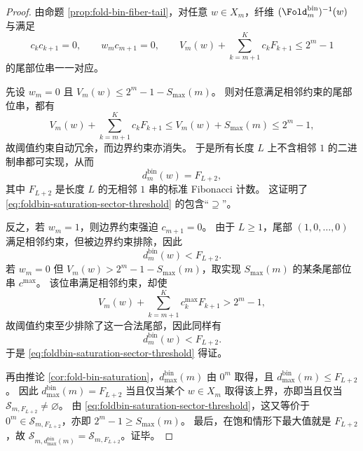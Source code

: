 \begin{proof}
由命题 \ref{prop:fold-bin-fiber-tail}，对任意 \(w\in X_m\)，纤维 \((\Fold_m^{\mathrm{bin}})^{-1}(w)\) 与满足
\[
c_kc_{k+1}=0,\qquad
w_mc_{m+1}=0,\qquad
V_m(w)+\sum_{k=m+1}^{K}c_kF_{k+1}\le 2^m-1
\]
的尾部位串一一对应。

先设 \(w_m=0\) 且 \(V_m(w)\le 2^m-1-S_{\max}(m)\)。
则对任意满足相邻约束的尾部位串，都有
\[
V_m(w)+\sum_{k=m+1}^{K}c_kF_{k+1}
\le
V_m(w)+S_{\max}(m)
\le
2^m-1,
\]
故阈值约束自动冗余，而边界约束亦消失。
于是所有长度 \(L\) 上不含相邻 \(1\) 的二进制串都可实现，从而
\[
d_m^{\mathrm{bin}}(w)=F_{L+2},
\]
其中 \(F_{L+2}\) 是长度 \(L\) 的无相邻 \(1\) 串的标准 Fibonacci 计数。
这证明了 \eqref{eq:foldbin-saturation-sector-threshold} 的包含“\(\supseteq\)”。

反之，若 \(w_m=1\)，则边界约束强迫 \(c_{m+1}=0\)。
由于 \(L\ge 1\)，尾部 \((1,0,\dots,0)\) 满足相邻约束，但被边界约束排除，因此
\[
d_m^{\mathrm{bin}}(w)<F_{L+2}.
\]
若 \(w_m=0\) 但 \(V_m(w)>2^m-1-S_{\max}(m)\)，取实现 \(S_{\max}(m)\) 的某条尾部位串 \(c^{\max}\)。
该位串满足相邻约束，却使
\[
V_m(w)+\sum_{k=m+1}^{K}c_k^{\max}F_{k+1}
>
2^m-1,
\]
故阈值约束至少排除了这一合法尾部，因此同样有
\[
d_m^{\mathrm{bin}}(w)<F_{L+2}.
\]
于是 \eqref{eq:foldbin-saturation-sector-threshold} 得证。

再由推论 \ref{cor:fold-bin-saturation}，\(d^{\mathrm{bin}}_{\max}(m)\) 由 \(0^m\) 取得，且 \(d^{\mathrm{bin}}_{\max}(m)\le F_{L+2}\)。
因此 \(d^{\mathrm{bin}}_{\max}(m)=F_{L+2}\) 当且仅当某个 \(w\in X_m\) 取得该上界，亦即当且仅当 \(\mathcal S_{m,F_{L+2}}\neq\varnothing\)。
由 \eqref{eq:foldbin-saturation-sector-threshold}，这又等价于 \(0^m\in\mathcal S_{m,F_{L+2}}\)，亦即 \(2^m-1\ge S_{\max}(m)\)。
最后，在饱和情形下最大值就是 \(F_{L+2}\)，故 \(\mathcal S_{m,d^{\mathrm{bin}}_{\max}(m)}=\mathcal S_{m,F_{L+2}}\)。证毕。
\end{proof}

